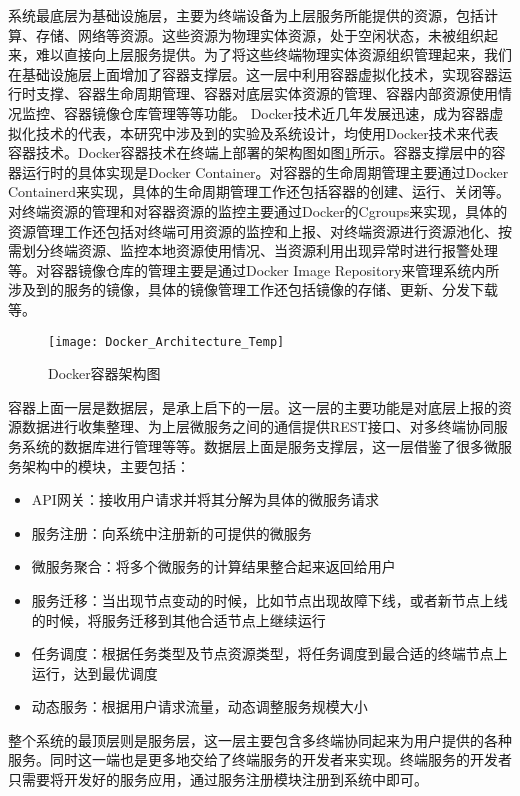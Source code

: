 系统最底层为基础设施层，主要为终端设备为上层服务所能提供的资源，包括计算、存储、网络等资源。这些资源为物理实体资源，处于空闲状态，未被组织起来，难以直接向上层服务提供。为了将这些终端物理实体资源组织管理起来，我们在基础设施层上面增加了容器支撑层。这一层中利用容器虚拟化技术，实现容器运行时支撑、容器生命周期管理、容器对底层实体资源的管理、容器内部资源使用情况监控、容器镜像仓库管理等等功能。
Docker技术近几年发展迅速，成为容器虚拟化技术的代表，本研究中涉及到的实验及系统设计，均使用Docker技术来代表容器技术。Docker容器技术在终端上部署的架构图如图\ref{fig:docker_architecture}所示。容器支撑层中的容器运行时的具体实现是Docker Container。对容器的生命周期管理主要通过Docker Containerd来实现，具体的生命周期管理工作还包括容器的创建、运行、关闭等。对终端资源的管理和对容器资源的监控主要通过Docker的Cgroups来实现，具体的资源管理工作还包括对终端可用资源的监控和上报、对终端资源进行资源池化、按需划分终端资源、监控本地资源使用情况、当资源利用出现异常时进行报警处理等。对容器镜像仓库的管理主要是通过Docker Image Repository来管理系统内所涉及到的服务的镜像，具体的镜像管理工作还包括镜像的存储、更新、分发下载等。
\begin{figure}[!htbp]
    \centering
    \texttt{[image: Docker\_Architecture\_Temp]}
    \caption{Docker容器架构图}
    \label{fig:docker_architecture}
\end{figure}

容器上面一层是数据层，是承上启下的一层。这一层的主要功能是对底层上报的资源数据进行收集整理、为上层微服务之间的通信提供REST接口、对多终端协同服务系统的数据库进行管理等等。数据层上面是服务支撑层，这一层借鉴了很多微服务架构中的模块，主要包括：
\begin{itemize}
    \item API网关：接收用户请求并将其分解为具体的微服务请求
    \item 服务注册：向系统中注册新的可提供的微服务
    \item 微服务聚合：将多个微服务的计算结果整合起来返回给用户
    \item 服务迁移：当出现节点变动的时候，比如节点出现故障下线，或者新节点上线的时候，将服务迁移到其他合适节点上继续运行
    \item 任务调度：根据任务类型及节点资源类型，将任务调度到最合适的终端节点上运行，达到最优调度
    \item 动态服务：根据用户请求流量，动态调整服务规模大小
\end{itemize}

整个系统的最顶层则是服务层，这一层主要包含多终端协同起来为用户提供的各种服务。同时这一端也是更多地交给了终端服务的开发者来实现。终端服务的开发者只需要将开发好的服务应用，通过服务注册模块注册到系统中即可。

